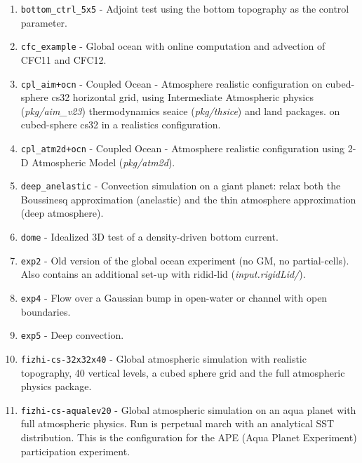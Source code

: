 \begin{enumerate}
\item \texttt{bottom\_ctrl\_5x5} - Adjoint test using the bottom
  topography as the control parameter.

\item \texttt{cfc\_example} - Global ocean with online computation and
  advection of CFC11 and CFC12.

\item \texttt{cpl\_aim+ocn} - Coupled Ocean - Atmosphere realistic 
  configuration on cubed-sphere cs32 horizontal grid, 
  using Intermediate Atmospheric physics ({\it pkg/aim\_v23})
  thermodynamics seaice ({\it pkg/thsice}) and land packages.
  on cubed-sphere cs32 in a realistics configuration.

\item \texttt{cpl\_atm2d+ocn} - Coupled Ocean - Atmosphere realistic 
  configuration using 2-D Atmospheric Model ({\it pkg/atm2d}).

\item \texttt{deep\_anelastic} - Convection simulation on a giant planet:
  relax both the Boussinesq approximation (anelastic) and the thin atmosphere
  approximation (deep atmosphere).

\item \texttt{dome} - Idealized 3D test of a density-driven bottom current.

\item \texttt{exp2} - Old version of the global ocean experiment (no GM, 
      no partial-cells).\\
  Also contains an additional set-up with ridid-lid ({\it input.rigidLid/}).

\item \texttt{exp4} - Flow over a Gaussian bump in open-water or
  channel with open boundaries.
  
\item \texttt{exp5} - Deep convection.

\item \texttt{fizhi-cs-32x32x40} - Global atmospheric simulation with
  realistic topography, 40 vertical levels, a cubed sphere grid and
  the full atmospheric physics package.

\item \texttt{fizhi-cs-aqualev20} - Global atmospheric simulation on an
  aqua planet with full atmospheric physics. Run is perpetual march
  with an analytical SST distribution.  This is the configuration for
  the APE (Aqua Planet Experiment) participation experiment.


\end{enumerate}
